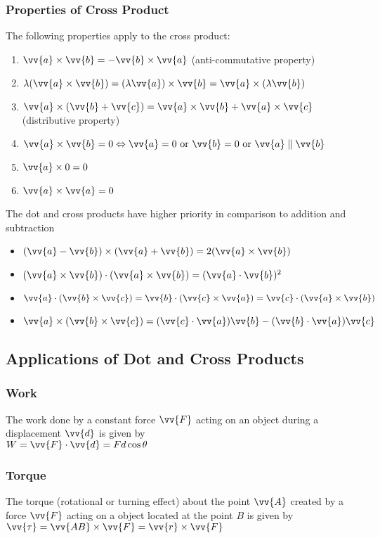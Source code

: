 \documentclass{article}
\begin{document}
	\subsubsection{Properties of Cross Product}
	The following properties apply to the cross product:
	\begin{enumerate}
		\item $\vv{a}\times\vv{b}=-\vv{b}\times\vv{a}$ (anti-commutative property)
		\item $\lambda(\vv{a}\times\vv{b})=(\lambda\vv{a})\times\vv{b}=\vv{a}\times(\lambda\vv{b})$
		\item $\vv{a}\times(\vv{b}+\vv{c})=\vv{a}\times\vv{b}+\vv{a}\times\vv{c}$ (distributive property)
		\item $\vv{a}\times\vv{b}=0\Leftrightarrow\vv{a}=0\text{ or }\vv{b}=0\text{ or }\vv{a}\parallel\vv{b}$
		\item $\vv{a}\times0=0$
		\item $\vv{a}\times\vv{a}=0$
	\end{enumerate}
	The dot and cross products have higher priority in comparison to addition and subtraction
	\begin{itemize}
		\item $(\vv{a}-\vv{b})\times(\vv{a}+\vv{b})=2(\vv{a}\times\vv{b})$
		\item $(\vv{a}\times\vv{b})\cdot(\vv{a}\times\vv{b})=(\vv{a}\cdot\vv{b})^2$
		\item $\vv{a}\cdot(\vv{b}\times\vv{c})=\vv{b}\cdot(\vv{c}\times\vv{a})=\vv{c}\cdot(\vv{a}\times\vv{b})$
		\item $\vv{a}\times(\vv{b}\times\vv{c})=(\vv{c}\cdot\vv{a})\vv{b}-(\vv{b}\cdot\vv{a})\vv{c}$
	\end{itemize}
	\subsection{Applications of Dot and Cross Products}
	\subsubsection{Work}
	The work done by a constant force $\vv{F}$ acting on an object during a displacement $\vv{d}$ is given by\\$W=\vv{F}\cdot\vv{d}=Fd\cos\theta$
	\subsubsection{Torque}
	The torque (rotational or turning effect) about the point $\vv{A}$ created by a force $\vv{F}$ acting on a object located at the point $B$ is given by $\vv{\tau}=\vv{AB}\times\vv{F}=\vv{r}\times\vv{F}$
\end{document}
